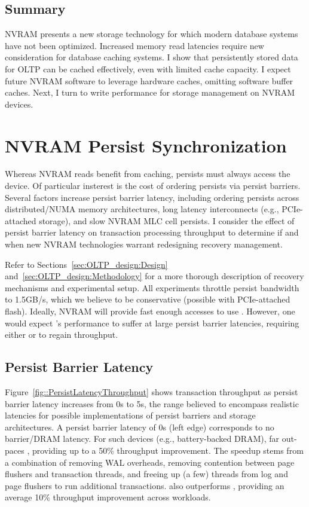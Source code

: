 \subsection{Summary}
\label{sec:OLTP_eval:Reads:Summary}
NVRAM presents a new storage technology for which modern database systems have not been optimized.
Increased memory read latencies require new consideration for database caching systems.
I show that persistently stored data for OLTP can be cached effectively, even with limited cache capacity.
I expect future NVRAM software to leverage hardware caches, omitting software buffer caches.
Next, I turn to write performance for storage management on NVRAM devices.

\section{NVRAM Persist Synchronization}
\label{sec:OLTP_eval:Persists}

Whereas NVRAM reads benefit from caching, persists must always access the device.
Of particular insterest is the cost of ordering persists via persist barriers.
Several factors increase persist barrier latency, including ordering persists across distributed/NUMA memory architectures, long latency interconnects (e.g., PCIe-attached storage), and slow NVRAM MLC cell persists.
I consider the effect of persist barrier latency on transaction processing throughput to determine if and when new NVRAM technologies warrant redesigning recovery management.

Refer to Sections~\ref{sec:OLTP_design:Design} and~\ref{sec:OLTP_design:Methodology} for a more thorough description of recovery mechanisms and experimental setup.
All experiments throttle persist bandwidth to 1.5GB/s, which we believe to be conservative (possible with PCIe-attached flash).
Ideally, NVRAM will provide fast enough accesses to use \InPlace.
However, one would expect \InPlace's performance to suffer at large persist barrier latencies, requiring either \NVDisk or \GroupCommit to regain throughput.

\subsection{Persist Barrier Latency}
\label{sec:OLTP_eval:Persists:Performance}



Figure~\ref{fig::PersistLatencyThroughput} shows transaction throughput as persist barrier latency increases from 0\textmu s to 5\textmu s, the range believed to encompass realistic latencies for possible implementations of persist barriers and storage architectures.
A persist barrier latency of 0\textmu s (left edge) corresponds to no barrier/DRAM latency.
For such devices (e.g., battery-backed DRAM), \InPlace far out-paces \NVDisk, providing up to a 50\% throughput improvement.
The speedup stems from a combination of removing WAL overheads, removing contention between page flushers and transaction threads, and freeing up (a few) threads from log and page flushers to run additional transactions.
\InPlace also outperforms \GroupCommit, providing an average 10\% throughput improvement across workloads.

